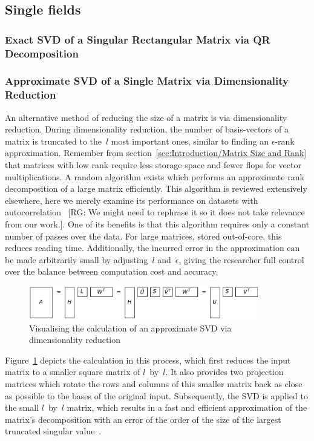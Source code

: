 \documentclass[ijgi,article,submit,moreauthors,pdftex,10pt,a4paper]{Definitions/mdpi}
\begin{document}
\subsection{Single fields}

\subsubsection{Exact SVD of a Singular Rectangular Matrix via QR Decomposition}

\subsubsection{Approximate SVD of a Single Matrix via Dimensionality Reduction}
\label{sec:Results/Approximate SVD of a Single Matrix via Dimensionality Reduction}
An alternative method of reducing the size of a matrix is via dimensionality reduction. During dimensionality reduction, the number of basis-vectors of a matrix is truncated to the~$l$ most important ones, similar to finding an $\epsilon$-rank approximation. Remember from section~\ref{sec:Introduction/Matrix Size and Rank} that matrices with low rank require less storage space and fewer flops for vector multiplications. A random algorithm exists which performs an approximate rank decomposition of a large matrix efficiently. This algorithm is reviewed extensively elsewhere, here we merely examine its performance on datasets with autocorrelation~\cite{Halko2011, Li2016} [RG: We might need to rephrase it so it does not take relevance from our work.]. One of its benefits is that this algorithm requires only a constant number of passes over the data. For large matrices, stored out-of-core, this reduces reading time. Additionally, the incurred error in the approximation can be made arbitrarily small by adjusting~$l$ and~$\epsilon$, giving the researcher full control over the balance between computation cost and accuracy.

\begin{figure}[H]
\centering
\includegraphics[width=100mm]{Results/reduceSizeRandomisedSquare.pdf}
\caption[Approximate randomised SVD]{Visualising the calculation of an approximate SVD via dimensionality reduction}
\label{fig:reduceSizeRandomisedSquare}
\end{figure}

Figure~\ref{fig:reduceSizeRandomisedSquare} depicts the calculation in this process, which first reduces the input matrix to a smaller square matrix of $l$~by~$l$. It also provides two projection matrices which rotate the rows and columns of this smaller matrix back as close as possible to the bases of the original input. Subsequently, the SVD is applied to the small $l$~by~$l$ matrix, which results in a fast and efficient approximation of the matrix's decomposition with an error of the order of the size of the largest truncated singular value~\cite{Martinsson2016, Halko2011}.
\end{document}
